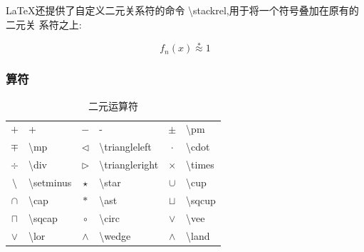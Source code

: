 \documentclass[a4paper]{ctexart}
\begin{document}
    \LaTeX 还提供了自定义二元关系符的命令 \textbackslash stackrel,用于将一个符号叠加在原有的二元关 系符之上:\par
    \[
        f_n(x) \stackrel{*}{\approx} 1    
    \]
    \subsubsection{算符}
    \begin{table}[H]
        \centering
        \caption{二元运算符}
        \begin{tabular}{clclcl}
            \toprule
            $+$                 & +                         &$-$                    & -                                 &         
            $\pm$               & \textbackslash pm                                                                     \\
            $\mp$               & \textbackslash mp         & $\triangleleft$       & \textbackslash triangleleft       &
            $\cdot$             & \textbackslash cdot                                                                   \\
            $\div$              & \textbackslash div        & $\triangleright$      & \textbackslash triangleright      &
            $\times$            & \textbackslash times                                                                  \\
            $\setminus$         & \textbackslash setminus   & $\star$               & \textbackslash star               &
            $\cup$              & \textbackslash cup                                                                    \\
            $\cap$              & \textbackslash cap        & $\ast$                & \textbackslash ast                &
            $\sqcup$            & \textbackslash sqcup                                                                  \\
            $\sqcap$            & \textbackslash sqcap      & $\circ$               & \textbackslash circ               &
            $\vee$              & \textbackslash vee                                                                    \\
            $\lor$              & \textbackslash lor        & $\wedge$              & \textbackslash wedge              &
            $\land$             & \textbackslash land                                                                   \\

\end{tabular}
\end{table}
\end{document}
